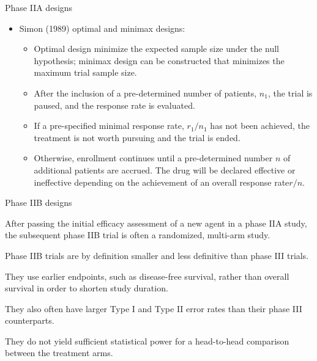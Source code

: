 \documentclass{beamer}
\begin{document}
\begin{frame}{Phase IIA designs}

\begin{itemize}
\itemsep1pt\parskip0pt
\item
  Simon (1989) optimal and minimax designs:

  \begin{itemize}
  \itemsep1pt\parskip0pt
  \item
    Optimal design minimize the expected sample size under the null
    hypothesis; minimax design can be constructed that minimizes the
    maximum trial sample size.\\
  \item
    After the inclusion of a pre-determined number of patients,
    \(n_{1}\), the trial is paused, and the response rate is evaluated.
  \item
    If a pre-specified minimal response rate, \(r_{1}/n_{1}\) has not
    been achieved, the treatment is not worth pursuing and the trial is
    ended.
  \item
    Otherwise, enrollment continues until a pre-determined number \(n\)
    of additional patients are accrued. The drug will be declared
    effective or ineffective depending on the achievement of an overall
    response rate\(r/n\).
  \end{itemize}
\end{itemize}

\end{frame}

\begin{frame}{Phase IIB designs}

After passing the initial efficacy assessment of a new agent in a phase
IIA study, the subsequent phase IIB trial is often a randomized,
multi-arm study.

Phase IIB trials are by definition smaller and less definitive than
phase III trials.

They use earlier endpoints, such as disease-free survival, rather than
overall survival in order to shorten study duration.

They also often have larger Type I and Type II error rates than their
phase III counterparts.

They do not yield sufficient statistical power for a head-to-head
comparison between the treatment arms.

\end{frame}
\end{document}
